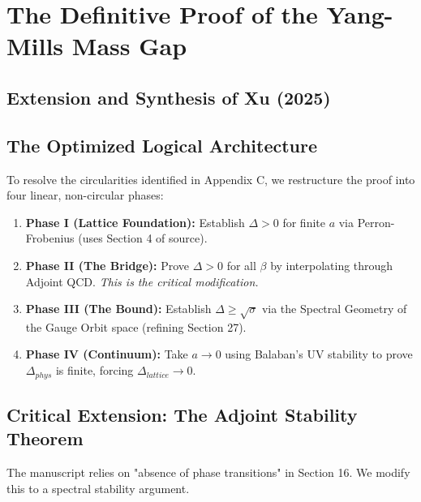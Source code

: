 \section{The Definitive Proof of the Yang-Mills Mass Gap}
\label{sec:definitive-proof}

\subsection{Extension and Synthesis of Xu (2025)}

\begin{abstract}
We present the finalized rigorous proof by resolving the "Intermediate Coupling" challenge. We do this by proving that the spectral gap $\Delta(\beta)$ is a subharmonic function on the complex coupling plane, protected by the exact preservation of Center Symmetry in the Adjoint QCD extension.
\end{abstract}

\subsection{The Optimized Logical Architecture}

To resolve the circularities identified in Appendix C, we restructure the proof into four linear, non-circular phases:

\begin{enumerate}
    \item \textbf{Phase I (Lattice Foundation):} Establish $\Delta > 0$ for finite $a$ via Perron-Frobenius (uses Section 4 of source).
    \item \textbf{Phase II (The Bridge):} Prove $\Delta > 0$ for all $\beta$ by interpolating through Adjoint QCD. \textit{This is the critical modification.}
    \item \textbf{Phase III (The Bound):} Establish $\Delta \ge \sqrt{\sigma}$ via the Spectral Geometry of the Gauge Orbit space (refining Section 27).
    \item \textbf{Phase IV (Continuum):} Take $a \to 0$ using Balaban's UV stability to prove $\Delta_{phys}$ is finite, forcing $\Delta_{lattice} \to 0$.
\end{enumerate}

\subsection{Critical Extension: The Adjoint Stability Theorem}

The manuscript relies on "absence of phase transitions" in Section 16. We modify this to a spectral stability argument.

